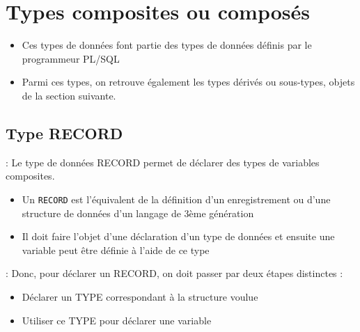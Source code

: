 \documentclass[10pt]{beamer}
\begin{document}
\begin{frame}{\secname}
    
\end{frame}

\begin{frame}{\secname}
    
\end{frame}

\section{Types composites ou composés}
\begin{frame}{\secname}
    \begin{itemize}
        \item Ces types de données font partie des types de données définis par le programmeur PL/SQL
        \item Parmi ces types, on retrouve également les types dérivés ou sous-types, objets de la section suivante.
    \end{itemize}
\end{frame}

\subsection{Type RECORD}
\begin{frame}{\secname : \subsecname}
    Le type de données RECORD permet de déclarer des types de variables composites.
    \begin{itemize}
        \item Un \lstinline[language=xml]!RECORD! est l'équivalent de la définition d'un enregistrement ou d'une structure de données d'un langage de 3ème génération
        \item Il doit faire l'objet d'une déclaration d'un type de données et ensuite une variable peut être définie à l'aide de ce type
    \end{itemize}
\end{frame}

\begin{frame}{\secname : \subsecname}
    Donc, pour déclarer un RECORD, on doit passer par deux étapes distinctes :
    \begin{itemize}
        \item Déclarer un TYPE correspondant à la structure voulue
        \item Utiliser ce TYPE pour déclarer une variable
    \end{itemize}
\end{frame}
\end{document}

